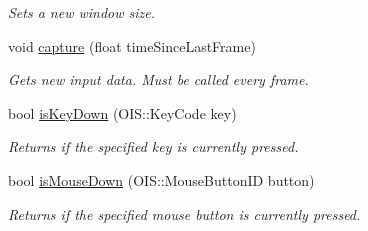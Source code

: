 \begin{DoxyCompactItemize}
\begin{DoxyCompactList}\small\item\em \-Sets a new window size. \end{DoxyCompactList}\item 
\hypertarget{classInputManager_a81e5485d8163efd13bbc01a59cd141a9}{
void \hyperlink{classInputManager_a81e5485d8163efd13bbc01a59cd141a9}{capture} (float time\-Since\-Last\-Frame)}
\label{d5/d39/classInputManager_a81e5485d8163efd13bbc01a59cd141a9}

\begin{DoxyCompactList}\small\item\em \-Gets new input data. \-Must be called every frame. \end{DoxyCompactList}\item 
\hypertarget{classInputManager_a45c8501e0882d38c58a60e4ecdc80cc9}{
bool \hyperlink{classInputManager_a45c8501e0882d38c58a60e4ecdc80cc9}{is\-Key\-Down} (\-O\-I\-S\-::\-Key\-Code key)}
\label{d5/d39/classInputManager_a45c8501e0882d38c58a60e4ecdc80cc9}

\begin{DoxyCompactList}\small\item\em \-Returns if the specified key is currently pressed. \end{DoxyCompactList}\item 
\hypertarget{classInputManager_ad9ffdd4e629efeafc8cc3f6d6cac9238}{
bool \hyperlink{classInputManager_ad9ffdd4e629efeafc8cc3f6d6cac9238}{is\-Mouse\-Down} (\-O\-I\-S\-::\-Mouse\-Button\-I\-D button)}
\label{d5/d39/classInputManager_ad9ffdd4e629efeafc8cc3f6d6cac9238}

\begin{DoxyCompactList}\small\item\em \-Returns if the specified mouse button is currently pressed. \end{DoxyCompactList}\end{DoxyCompactItemize}
